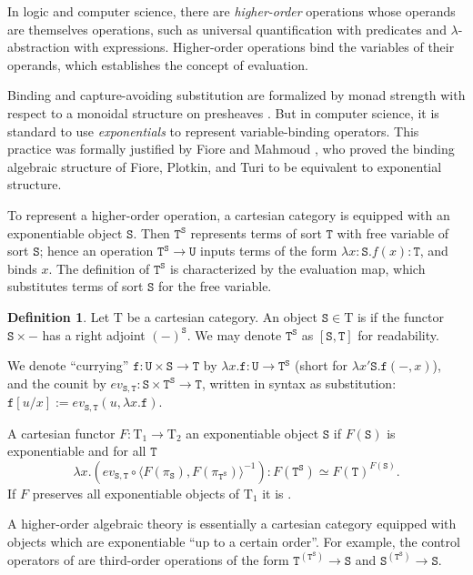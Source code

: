 \documentclass[12pt]{article}
\theoremstyle{definition}
\newtheorem{definition}[theorem]{Definition}
\newcommand{\define}[1]{{\bf \boldmath{#1}}}
\newcommand{\mrm}[1]{\mathrm{#1}}
\newcommand{\mtt}[1]{\mathtt{#1}}
\newcommand{\T}{\mrm{T}}
\newcommand{\tts}{\mtt{S}}
\newcommand{\ttt}{\mtt{T}}
\newcommand{\ttu}{\mtt{U}}
\newcommand{\ttf}{\mtt{f}}
\begin{document}
In logic and computer science, there are \textit{higher-order} operations whose operands are themselves operations, such as universal quantification with predicates and $\lambda$-abstraction with expressions. Higher-order operations bind the variables of their operands, which establishes the concept of evaluation.

Binding and capture-avoiding substitution are formalized by monad strength with respect to a monoidal structure on presheaves \cite{abssyn}. But in computer science, it is standard to use \textit{exponentials} to represent variable-binding operators. This practice was formally justified by Fiore and Mahmoud \cite{soats}, who proved the binding algebraic structure of Fiore, Plotkin, and Turi \cite{abssyn} to be equivalent to exponential structure.

To represent a higher-order operation, a cartesian category is equipped with an exponentiable object $\tts$. Then $\ttt^\tts$ represents terms of sort $\ttt$ with free variable of sort $\tts$; hence an operation $\ttt^\tts\to \ttu$ inputs terms of the form $\lambda x:\tts.f(x):\ttt$, and binds $x$. The definition of $\ttt^\tts$ is characterized by the evaluation map, which substitutes terms of sort $\tts$ for the free variable.

\begin{definition}
    Let $\T$ be a cartesian category. An object $\tts\in \T$ is \define{exponentiable} if the functor $\tts\times -$ has a right adjoint $(-)^\tts$. We may denote $\ttt^\tts$ as $[\tts,\ttt]$ for readability.

    
    We denote ``currying'' $\ttf:\ttu\times \tts\to \ttt$ by $\lambda x.\ttf:\ttu\to \ttt^\tts$ (short for $\lambda x'\tts.\ttf(-,x)$), and the counit by $ev_{\tts,\ttt}:\tts\times \ttt^\tts\to \ttt$, written in syntax as substitution: $\ttf[u/x] := ev_{\tts,\ttt}(u,\lambda x.\ttf)$.
    
    A cartesian functor $F:\T_1\to \T_2$ \define{preserves} an exponentiable object $\tts$ if $F(\tts)$ is exponentiable and for all $\ttt$ $$\lambda x.(ev_{\tts,\ttt}\circ \langle F(\pi_\tts),F(\pi_{\ttt^\tts})\rangle^{-1}):F(\ttt^\tts)\simeq F(\ttt)^{F(\tts)}.$$ If $F$ preserves all exponentiable objects of $\T_1$ it is \define{cartex}.
\end{definition}

A higher-order algebraic theory is essentially a cartesian category equipped with objects which are exponentiable ``up to a certain order''. For example, the control operators of \cite{escard} are third-order operations of the form $\ttt^{(\ttt^\tts)}\to \tts$ and $\tts^{(\ttt^\tts)}\to \tts$.
\end{document}
